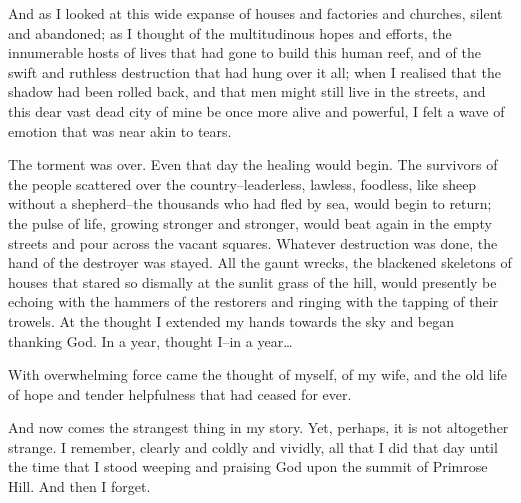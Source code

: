 And as I looked at this wide expanse of houses and factories and
churches, silent and abandoned; as I thought of the multitudinous
hopes and efforts, the innumerable hosts of lives that had gone to
build this human reef, and of the swift and ruthless destruction
that had hung over it all; when I realised that the shadow had been
rolled back, and that men might still live in the streets, and this
dear vast dead city of mine be once more alive and powerful, I felt
a wave of emotion that was near akin to tears.

The torment was over. Even that day the healing would begin. The
survivors of the people scattered over the country--leaderless,
lawless, foodless, like sheep without a shepherd--the thousands who
had fled by sea, would begin to return; the pulse of life, growing
stronger and stronger, would beat again in the empty streets and
pour across the vacant squares. Whatever destruction was done, the
hand of the destroyer was stayed. All the gaunt wrecks, the
blackened skeletons of houses that stared so dismally at the sunlit
grass of the hill, would presently be echoing with the hammers of
the restorers and ringing with the tapping of their trowels. At the
thought I extended my hands towards the sky and began thanking God.
In a year, thought I--in a year\ldots{}

With overwhelming force came the thought of myself, of my wife, and
the old life of hope and tender helpfulness that had ceased for
ever.

And now comes the strangest thing in my story. Yet, perhaps, it is
not altogether strange. I remember, clearly and coldly and vividly,
all that I did that day until the time that I stood weeping and
praising God upon the summit of Primrose Hill. And then I forget.

